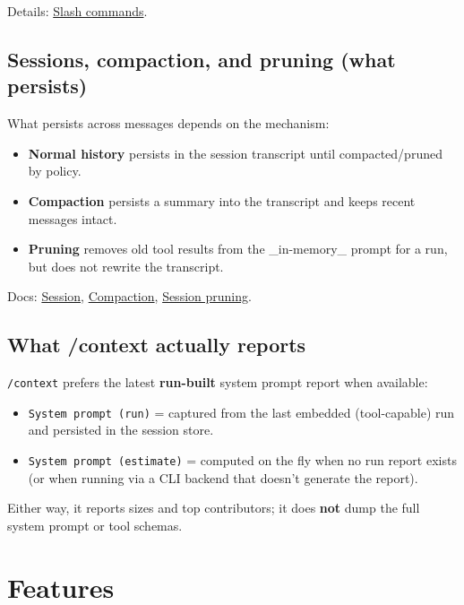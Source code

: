 Details: \href{/tools/slash-commands}{Slash commands}.

\subsection{Sessions, compaction, and pruning (what persists)}


What persists across messages depends on the mechanism:

\begin{itemize}
  \item \textbf{Normal history} persists in the session transcript until compacted/pruned by policy.
  \item \textbf{Compaction} persists a summary into the transcript and keeps recent messages intact.
  \item \textbf{Pruning} removes old tool results from the \_in-memory\_ prompt for a run, but does not rewrite the transcript.
\end{itemize}


Docs: \href{/concepts/session}{Session}, \href{/concepts/compaction}{Compaction}, \href{/concepts/session-pruning}{Session pruning}.

\subsection{What /context actually reports}


\texttt{/context} prefers the latest \textbf{run-built} system prompt report when available:

\begin{itemize}
  \item \texttt{System prompt (run)} = captured from the last embedded (tool-capable) run and persisted in the session store.
  \item \texttt{System prompt (estimate)} = computed on the fly when no run report exists (or when running via a CLI backend that doesn’t generate the report).
\end{itemize}


Either way, it reports sizes and top contributors; it does \textbf{not} dump the full system prompt or tool schemas.


\clearpage

\section{Features}


